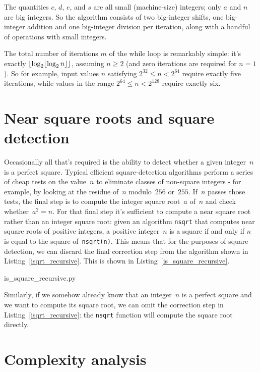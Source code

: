 \documentclass[a4paper]{article}
\DeclarePairedDelimiter\floor{\lfloor}{\rfloor}
\theoremstyle{plain}
\theoremstyle{definition}
\begin{document}
The quantities $c$, $d$, $e$, and $s$ are all small (machine-size) integers;
only $a$ and $n$ are big integers. So the algorithm consists of two big-integer
shifts, one big-integer addition and one big-integer division per iteration,
along with a handful of operations with small integers.

The total number of iterations $m$ of the while loop is remarkably simple: it's
exactly $\floor*{\log_2 \floor{\log_2 n}}$, assuming $n\ge 2$ (and zero
iterations are required for $n = 1$). So for example, input values $n$
satisfying $2^{32} \le n < 2^{64}$ require exactly five iterations, while
values in the range $2^{64} \le n < 2^{128}$ require exactly six.

\section{Near square roots and square detection}

Occasionally all that's required is the ability to detect whether a given
integer~$n$ is a perfect square. Typical efficient square-detection algorithms
perform a series of cheap tests on the value~$n$ to eliminate classes of
non-square integers - for example, by looking at the residue of~$n$
modulo~$256$ or~$255$. If~$n$ passes those tests, the final step is to compute
the integer square root~$a$ of~$n$ and check whether~$a^2 = n$.
For that final step it's sufficient to compute a near square root rather than
an integer square root: given an algorithm \lstinline{nsqrt} that computes near
square roots of positive integers, a positive integer~$n$ is a square if and
only if $n$ is equal to the square of~\lstinline$nsqrt(n)$. This means that for
the purposes of square detection, we can discard the final correction step from
the algorithm shown in Listing~\ref{isqrt_recursive}. This is shown in
Listing~\ref{is_square_recursive}.


  {is_square_recursive.py}

Similarly, if we somehow already know that an integer~$n$ is a perfect square
and we want to compute its square root, we can omit the correction step in
Listing~\ref{isqrt_recursive}: the \lstinline$nsqrt$ function will compute the
square root directly.

\section{Complexity analysis}
\end{document}

